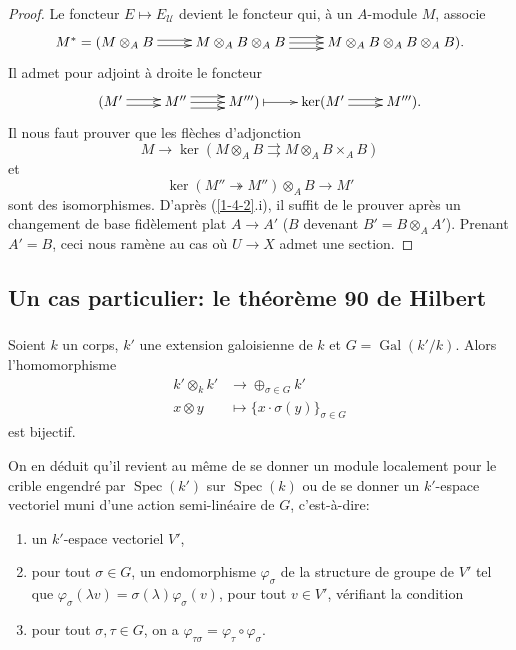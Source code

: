 \documentclass{article}
\DeclareMathOperator{\gal}{Gal}
\DeclareMathOperator{\spec}{Spec}
\newcommand{\cU}{\mathcal{U}}
\begin{document}
\begin{proof}
Le foncteur $E\mapsto E_\cU$ devient le foncteur qui, à un $A$-module $M$, 
associe 
\[\xymatrix{
  M^* = (M\otimes_A B \ar@<2pt>[r] \ar@<-2pt>[r] 
    & M\otimes_A B\otimes_A B \ar@<-4pt>[r] \ar[r] \ar@<4pt>[r] 
    & M\otimes_A B\otimes_A B\otimes_A B)\text{.}
}\]
Il admet pour adjoint à droite le foncteur
\[\xymatrix{
  (M' \ar@<2pt>[r] \ar@<-2pt>[r] 
    & M'' \ar@<-4pt>[r] \ar[r] \ar@<4pt>[r]
    & M''') \ar@{|->}[r] 
    & \ker(M' \ar@<2pt>[r] \ar@<-2pt>[r] 
    & M''')\text{.}
}\]
Il nous faut prouver que les flèches d'adjonction 
\[
  M \to\ker(M\otimes_A B\rightrightarrows M\otimes_A B\times_A B)
\]
et
\[
  \ker(M''\twoheadrightarrow M'')\otimes_A B \to M'
\]
sont des isomorphismes. D'après (\ref{1-4-2}.i), il suffit de le prouver 
après un changement de base fidèlement plat $A\to A'$ ($B$ devenant 
$B'=B\otimes_A A'$). Prenant $A'=B$, ceci nous ramène au cas où $U\to X$ 
admet une section. 
\end{proof}










\subsection{Un cas particulier: le théorème 90 de Hilbert}\label{1-5}





\subsubsection{}\label{1-5-1}

Soient $k$ un corps, $k'$ une extension galoisienne de $k$ et $G=\gal(k'/k)$. 
Alors l'homomorphisme 
\begin{align*}
  k'\otimes_k k' &\to \oplus_{\sigma\in G} k' \\
  x\otimes y     &\mapsto \{x\cdot \sigma(y)\}_{\sigma\in G}
\end{align*}
est bijectif. 

On en déduit qu'il revient au même de se donner un module localement pour 
le crible engendré par $\spec(k')$ sur $\spec(k)$ ou de se donner un 
$k'$-espace vectoriel muni d'une action semi-linéaire de $G$, c'est-à-dire: 
\begin{enumerate}[\indent a)]
  \item un $k'$-espace vectoriel $V'$,
  \item pour tout $\sigma\in G$, un endomorphisme $\varphi_\sigma$ de la 
    structure de groupe de $V'$ tel que 
    $\varphi_\sigma(\lambda v) = \sigma(\lambda) \varphi_\sigma(v)$, pour 
    tout $v\in V'$, vérifiant la condition 
  \item pour tout $\sigma,\tau\in G$, on a 
    $\varphi_{\tau\sigma} = \varphi_\tau\circ\varphi_\sigma$. 
\end{enumerate}
\end{document}
